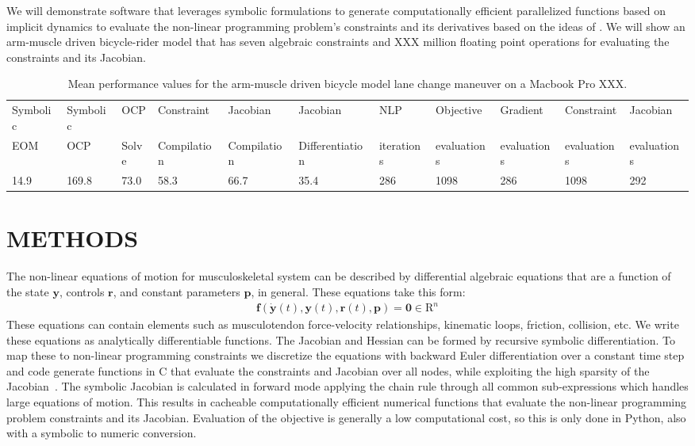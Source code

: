 \documentclass[11pt,twocolumn]{article}
\begin{document}
We will demonstrate software that leverages symbolic formulations to generate
computationally efficient parallelized functions based on implicit dynamics to evaluate the non-linear
programming problem's constraints and its derivatives based on the ideas of \cite{vandenBogert2011a}. We will show an
arm-muscle driven bicycle-rider model that has seven algebraic constraints and XXX million floating point
operations for evaluating the constraints and its Jacobian.
%
\begin{table}[t]
  \centering
  \caption{Mean performance values for the arm-muscle driven bicycle model lane
  change maneuver on a Macbook Pro XXX.}
  \scriptsize
  \begin{tabular}{lllllllllll}
    Symbolic & Symbolic & OCP & Constraint & Jacobian  & Jacobian & NLP & Objective &  Gradient & Constraint & Jacobian \\
    EOM & OCP & Solve & Compilation &  Compilation & Differentiation & iterations & evaluations & evaluations & evaluations & evaluations \\
    14.9 & 169.8 & 73.0 & 58.3 & 66.7 & 35.4 & 286 & 1098 & 286 & 1098 & 292
  \end{tabular}
  \label{tab:performance}
\end{table}

\section*{METHODS}
%
The non-linear equations of motion for musculoskeletal system can be described
by differential algebraic equations that are a function of the state
\(\mathbf{y}\), controls \(\mathbf{r}\), and constant parameters
\(\mathbf{p}\), in general. These equations take this form:
%
\begin{align}
  \mathbf{f}(\dot{\mathbf{y}}(t), \mathbf{y}(t), \mathbf{r}(t), \mathbf{p}) =
  \mathbf{0} \in \mathrm{R}^n
\end{align}
%
These equations can contain elements such as musculotendon force-velocity
relationships, kinematic loops, friction, collision, etc. We write these
equations as analytically differentiable functions. The Jacobian and Hessian can
be formed by recursive symbolic differentiation. To map these to non-linear
programming constraints we discretize the equations with backward Euler
differentiation over a constant time step and code generate functions in C that
evaluate the constraints and Jacobian over all nodes, while exploiting the high
sparsity of the Jacobian~\cite{Moore2018}. The symbolic Jacobian is calculated
in forward mode applying the chain rule through all common sub-expressions which
handles large equations of motion. This results in cacheable computationally
efficient numerical functions that evaluate the non-linear programming problem
constraints and its Jacobian. Evaluation of the objective is generally a low
computational cost, so this is only done in Python, also with a symbolic to
numeric conversion.
\end{document}
